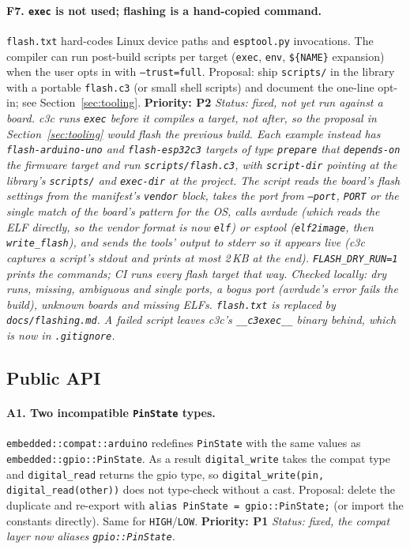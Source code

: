\documentclass[11pt,a4paper]{article}
\newcommand{\pkg}[1]{\texttt{#1}}
\newcommand{\prio}[1]{\textbf{Priority: #1}}
\begin{document}
\paragraph{F7. \pkg{exec} is not used; flashing is a hand-copied command.}
\pkg{flash.txt} hard-codes Linux device paths and \pkg{esptool.py} invocations. The compiler can
run post-build scripts per target (\pkg{exec}, \pkg{env}, \pkg{\$\{NAME\}} expansion) when the user
opts in with \pkg{--trust=full}. Proposal: ship \pkg{scripts/} in the library with a portable
\pkg{flash.c3} (or small shell scripts) and document the one-line opt-in; see
Section~\ref{sec:tooling}. \prio{P2}
\textit{Status: fixed, not yet run against a board. c3c runs \pkg{exec} before it compiles a target, not after, so the proposal in Section~\ref{sec:tooling} would flash the previous build. Each example instead has \pkg{flash-arduino-uno} and \pkg{flash-esp32c3} targets of type \pkg{prepare} that \pkg{depends-on} the firmware target and run \pkg{scripts/flash.c3}, with \pkg{script-dir} pointing at the library's \pkg{scripts/} and \pkg{exec-dir} at the project. The script reads the board's flash settings from the manifest's \pkg{vendor} block, takes the port from \pkg{--port}, \pkg{PORT} or the single match of the board's pattern for the OS, calls avrdude (which reads the ELF directly, so the vendor format is now \pkg{elf}) or esptool (\pkg{elf2image}, then \pkg{write\_flash}), and sends the tools' output to stderr so it appears live (c3c captures a script's stdout and prints at most 2\,KB at the end). \pkg{FLASH\_DRY\_RUN=1} prints the commands; CI runs every flash target that way. Checked locally: dry runs, missing, ambiguous and single ports, a bogus port (avrdude's error fails the build), unknown boards and missing ELFs. \pkg{flash.txt} is replaced by \pkg{docs/flashing.md}. A failed script leaves c3c's \pkg{\_\_c3exec\_\_} binary behind, which is now in \pkg{.gitignore}.}

\subsection{Public API}
\label{sec:api}

\paragraph{A1. Two incompatible \pkg{PinState} types.}
\pkg{embedded::compat::arduino} redefines \pkg{PinState} with the same values as
\pkg{embedded::gpio::PinState}. As a result \pkg{digital\_write} takes the compat type and
\pkg{digital\_read} returns the gpio type, so \pkg{digital\_write(pin, digital\_read(other))}
does not type-check without a cast. Proposal: delete the duplicate and re-export with
\pkg{alias PinState = gpio::PinState;} (or import the constants directly). Same for \pkg{HIGH}/\pkg{LOW}.
\prio{P1}
\textit{Status: fixed, the compat layer now aliases \pkg{gpio::PinState}.}
\end{document}
